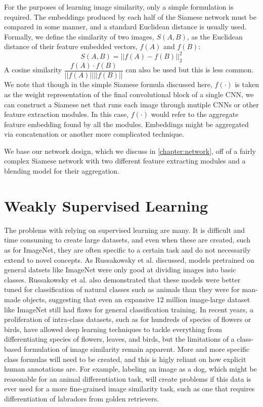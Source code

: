 For the purposes of learning image similarity, only a simple formulation is required. The embeddings produced by each half of the Siamese network must be compared in some manner, and a standard Euclidean distance is usually used. Formally, we define the similarity of two images, $S(A,B)$, as the Euclidean distance of their feature embedded vectors, $f(A)$ and $f(B)$:
\begin{equation}
S(A,B) = ||f(A) - f(B)||_2^2
\end{equation}
A cosine similarity $\dfrac{f(A) \cdot f(B)}{||f(A)||||f(B)||}$ can also be used but this is less common. We note that though in the simple Siamese formula discussed here, $f(\cdot)$ is taken as the weight representation of the final convolutional block of a single CNN, we can construct a Siamese net that runs each image through mutiple CNNs or other feature extraction modules. In this case, $f(\cdot)$ would refer to the aggregate feature embedding found by all the modules. Embeddings might be aggregated via concatenation or another more complicated technique.

We base our network design, which we discuss in \ref{chapter:network}, off of a fairly complex Siamese network with two different feature extracting modules and a blending model for their aggregation.


\section{Weakly Supervised Learning}
The problems with relying on supervised learning are many. It is difficult and time consuming to create large datasets, and even when these are created, such as for ImageNet, they are often specific to a certain task and do not necessarily extend to novel concepts. As Russakowsky et al. discussed\cite{russakovsky2013detecting}, models pretrained on general datsets like ImageNet were only good at dividing images into basic classes. Russakowsky et al. also demonstrated that these models were better tuned for classification of natural classes such as animals than they were for man-made objects, suggesting that even an expansive 12 million image-large dataset like ImageNet still had flaws for general classification training. In recent years, a proliferation of intra-class datasets, such as for hundreds of species of flowers or birds, have allowed deep learning techniques to tackle everything from differentiating species of flowers\cite{angelova2013image}, leaves\cite{rejeb2013vantage}, and birds\cite{berg2014birdsnap}, but the limitations of a class-based formulation of image similarity remain apparent. More and more specific class formulas will need to be created, and this is higly reliant on how explicit human annotations are. For example, labeling an image as a dog, which might be reasonable for an animal differentiation task, will create problems if this data is ever used for a more fine-grained image similarity task, such as one that requires differentiation of labradors from golden retrievers.

